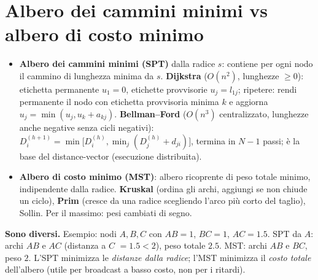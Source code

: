 \section{Albero dei cammini minimi vs albero di costo minimo}
\begin{itemize}[nosep]
\item \textbf{Albero dei cammini minimi (SPT)} dalla radice $s$: contiene per ogni nodo il cammino di lunghezza minima da $s$. \textbf{Dijkstra} ($O(n^2)$, lunghezze $\ge0$): etichetta permanente $u_1=0$, etichette provvisorie $u_j=l_{1j}$; ripetere: rendi permanente il nodo con etichetta provvisoria minima $k$ e aggiorna $u_j=\min(u_j,u_k+a_{kj})$. \textbf{Bellman--Ford} ($O(n^3)$ centralizzato, lunghezze anche negative senza cicli negativi): $D_i^{(h+1)}=\min\big[D_i^{(h)},\min_j(D_j^{(h)}+d_{ji})\big]$, termina in $N-1$ passi; è la base del distance-vector (esecuzione distribuita).
\item \textbf{Albero di costo minimo (MST)}: albero ricoprente di peso totale minimo, indipendente dalla radice. \textbf{Kruskal} (ordina gli archi, aggiungi se non chiude un ciclo), \textbf{Prim} (cresce da una radice scegliendo l'arco più corto del taglio), Sollin. Per il massimo: pesi cambiati di segno.
\end{itemize}
\textbf{Sono diversi.} Esempio: nodi $A,B,C$ con $AB=1$, $BC=1$, $AC=1.5$. SPT da $A$: archi $AB$ e $AC$ (distanza a $C$ $=1.5<2$), peso totale $2.5$. MST: archi $AB$ e $BC$, peso $2$. L'SPT minimizza le \emph{distanze dalla radice}; l'MST minimizza il \emph{costo totale} dell'albero (utile per broadcast a basso costo, non per i ritardi).

